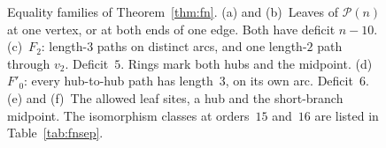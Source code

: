 \documentclass[ASNA]{USG}
\theoremstyle{WBstyletwo}
\numberwithin{equation}{section}
\begin{document}
\begin{figure}[htbp]

  \caption{Equality families of Theorem~\ref{thm:fn}.
    (a) and (b)~Leaves of $\mathcal P(n)$ at one vertex, or at both ends of one edge. Both have deficit $n-10$.
    (c)~$F_2$: length-$3$ paths on distinct arcs, and one length-$2$ path through $v_2$. Deficit~$5$. Rings mark both hubs and the midpoint.
    (d)~$F'_0$: every hub-to-hub path has length~$3$, on its own arc. Deficit~$6$.
    (e) and (f)~The allowed leaf sites, a hub and the short-branch midpoint.
    The isomorphism classes at orders~$15$ and~$16$ are listed in Table~\ref{tab:fnsep}.}
  \label{fig:fn}
\end{figure}
\end{document}
